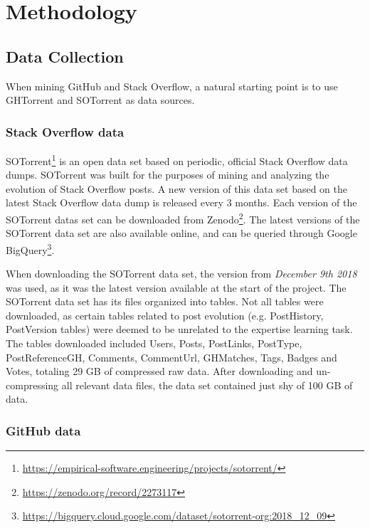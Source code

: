 \chapter{Methodology}

\section{\label{data_collection}Data Collection}

    When mining GitHub and Stack Overflow, a natural starting point is to use GHTorrent \cite{gousios2013ghtorent} and SOTorrent \cite{baltes2018sotorrent} as data sources.
    \subsection{Stack Overflow data}
    
        SOTorrent\footnote{\label{SOTorrent}\url{https://empirical-software.engineering/projects/sotorrent/}} is an open data set based on periodic, official Stack Overflow data dumps. SOTorrent was built for the purposes of mining and analyzing the evolution of Stack Overflow posts. A new version of this data set based on the latest Stack Overflow data dump is released every 3 months. Each version of the SOTorrent datas set can be downloaded from Zenodo\footnote{\label{SOTorrent_Zenodo} \url{https://zenodo.org/record/2273117}}. The latest versions of the SOTorrent data set are also available online, and can be queried through Google BigQuery\footnote{\label{BigQuery} \url{https://bigquery.cloud.google.com/dataset/sotorrent-org:2018_12_09}}.
        
        When downloading the SOTorrent data set, the version from \textit{December 9th 2018} was used, as it was the latest version available at the start of the project. The SOTorrent data set has its files organized into tables. Not all tables were downloaded, as certain tables related to post evolution (e.g. PostHistory, PostVersion tables) were deemed to be unrelated to the expertise learning task. The tables downloaded included Users, Posts, PostLinks, PostType, PostReferenceGH, Comments, CommentUrl, GHMatches, Tags, Badges and Votes, totaling 29 GB of compressed raw data. After downloading and un-compressing all relevant data files, the data set contained just shy of 100 GB of data.
        
    \subsection{GitHub data}
    
